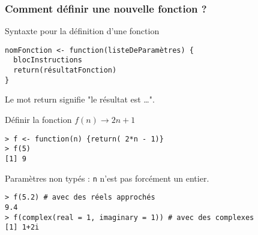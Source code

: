 \documentclass[10pt]{beamer}
\begin{document}
\begin{frame}[fragile]
  \frametitle{Comment définir une nouvelle fonction ?}

  \begin{alertblock}{Syntaxte pour la définition d'une fonction}
  \begin{lstlisting}[style=edblock]
nomFonction <- function(listeDeParamètres) {
  blocInstructions
  return(résultatFonction)
}
\end{lstlisting}
Le mot \alert{return} signifie "le résultat est \dots".
\end{alertblock}

\begin{exampleblock}{Définir la fonction $f(n) \rightarrow 2n + 1$}
  \begin{lstlisting}[style=block]
> f <- function(n) {return( 2*n - 1)}
> f(5)
[1] 9    
\end{lstlisting}
\end{exampleblock}
\begin{block}{Paramètres non typés : \texttt{n} n'est pas forcément un entier.}
 \begin{lstlisting}[style=block]
> f(5.2) # avec des réels approchés
9.4
> f(complex(real = 1, imaginary = 1)) # avec des complexes
[1] 1+2i
  \end{lstlisting}  
\end{block}
\end{frame}
\end{document}
